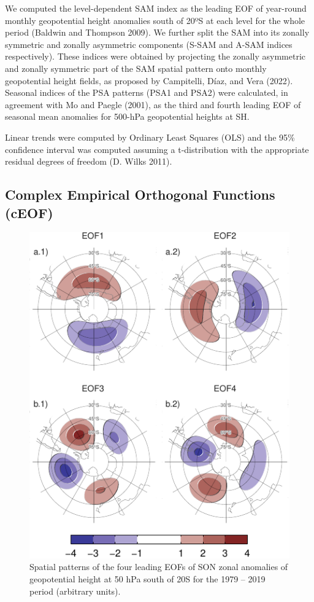 \documentclass[smallextended]{svjour3}       %
\begin{document}
We computed the level-dependent SAM index as the leading EOF of year-round monthly geopotential height anomalies south of 20ºS at each level for the whole period (Baldwin and Thompson 2009).
We further split the SAM into its zonally symmetric and zonally asymmetric components (S-SAM and A-SAM indices respectively).
These indices were obtained by projecting the zonally asymmetric and zonally symmetric part of the SAM spatial pattern onto monthly geopotential height fields, as proposed by Campitelli, Díaz, and Vera (2022).
Seasonal indices of the PSA patterns (PSA1 and PSA2) were calculated, in agreement with Mo and Paegle (2001), as the third and fourth leading EOF of seasonal mean anomalies for 500-hPa geopotential heights at SH.

Linear trends were computed by Ordinary Least Squares (OLS) and the 95\% confidence interval was computed assuming a t-distribution with the appropriate residual degrees of freedom (D. Wilks 2011).

\hypertarget{complex-empirical-orthogonal-functions-ceof}{%
\subsection{Complex Empirical Orthogonal Functions (cEOF)}\label{complex-empirical-orthogonal-functions-ceof}}



\begin{figure}
\centering
\includegraphics{../figures/eof-naive-1.pdf}
\caption{\label{fig:eof-naive}Spatial patterns of the four leading EOFs of SON zonal anomalies of geopotential height at 50 hPa south of 20\degree S for the 1979 -- 2019 period (arbitrary units).}
\end{figure}
\end{document}
